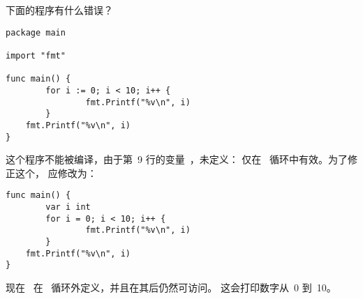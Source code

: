 \begin{Exercise}[title={作用域},difficulty=4]
\label{ex:scope}
\Question\label{ex:scope q1} 下面的程序有什么错误？

\begin{lstlisting}[numbers=right]
package main

import "fmt"
                                                                                                   
func main() {
        for i := 0; i < 10; i++ {
                fmt.Printf("%v\n", i)
        }
	fmt.Printf("%v\n", i)
}
\end{lstlisting}

\end{Exercise}

\begin{Answer}
\Question
这个程序不能被编译，由于第~9 行的变量~，未定义：
 仅在~ 循环中有效。为了修正这个，
 应修改为：
\begin{lstlisting}[numbers=none]
func main() {
        var i int
        for i = 0; i < 10; i++ {
                fmt.Printf("%v\n", i)
        }
	fmt.Printf("%v\n", i)
}
\end{lstlisting}
现在~ 在~ 循环外定义，并且在其后仍然可访问。
这会打印数字从~0 到~10。
\end{Answer}

